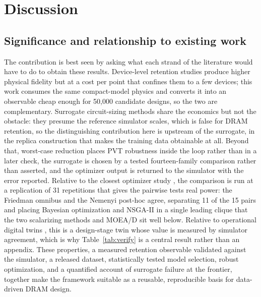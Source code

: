 \documentclass[11pt,a4paper]{article}
\begin{document}
\section{Discussion}
\label{sec:discussion}

\subsection{Significance and relationship to existing work}

The contribution is best seen by asking what each strand of the literature would
have to do to obtain these results. Device-level retention studies
\cite{kim2021rdf,kim2021trap,bepary2022aging,park2025capleak} produce higher
physical fidelity but at a cost per point that confines them to a few devices;
this work consumes the same compact-model physics and converts it into an
observable cheap enough for 50,000 candidate designs, so the two are
complementary. Surrogate circuit-sizing methods
\cite{budak2022sizing,rashid2024global,yin2023surrogate,lberni2024eadl} share the
economics but not the obstacle: they presume the reference simulator scales, which
is false for DRAM retention, so the distinguishing contribution here is upstream
of the surrogate, in the replica construction that makes the training data
obtainable at all. Beyond that, worst-case reduction places PVT robustness inside
the loop rather than in a later check, the surrogate is chosen by a tested
fourteen-family comparison rather than asserted, and the optimizer output is
returned to the simulator with the error reported. Relative to the closest
optimizer study \cite{saglican2023moead}, the comparison is run at a replication of
31 repetitions that gives the pairwise tests real power: the Friedman omnibus and
the Nemenyi post-hoc agree, separating 11 of the 15 pairs and placing Bayesian
optimization and NSGA-II in a single leading clique that the two scalarizing methods
and MOEA/D sit well below. Relative to operational
digital twins \cite{ruhe2023dtwin,massaro2025dtwin}, this is a design-stage twin
whose value is measured by simulator agreement, which is why
Table~\ref{tab:verify} is a central result rather than an appendix. These
properties, a measured retention observable validated against the simulator, a
released dataset, statistically tested model selection, robust optimization, and a
quantified account of surrogate failure at the frontier, together make the
framework suitable as a reusable, reproducible basis for data-driven DRAM design.
\end{document}
